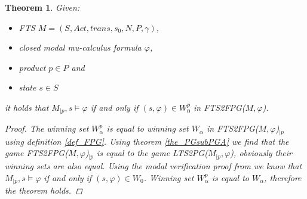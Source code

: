 \documentclass[]{article}
\newtheorem{theorem}{Theorem}[section]
\begin{document}
\begin{theorem}
	\label{the_FPG_ver_FTS}
	Given:
	\begin{itemize}
		\item FTS $M = (S, Act, trans, s_0, N, P, \gamma)$,
		\item closed modal mu-calculus formula $\varphi$,
		\item product $p \in P$ and
		\item state $s \in S$
	\end{itemize}
it holds that $M_{|p}, s \models \varphi$ if and only if $(s, \varphi) \in W_0^p$ in FTS2FPG($M, \varphi$).
\begin{proof}
	The winning set $W_\alpha^p$ is equal to winning set $W_\alpha$ in FTS2FPG($M, \varphi$)$_{|p}$ using definition \ref{def_FPG}. Using theorem \ref{the_PGsubPGA} we find that the game FTS2FPG($M, \varphi$)$_{|p}$ is equal to the game LTS2PG($M_{|p}, \varphi$), obviously their winning sets are also equal. Using the modal verification proof from \cite{Bradfield2018} we know that $M_{|p}, s \models \varphi$ if and only if $(s, \varphi) \in W_0$. Winning set $W_\alpha^p$ is equal to $W_\alpha$, therefore the theorem holds.
\end{proof}
\end{theorem}
\end{document}
